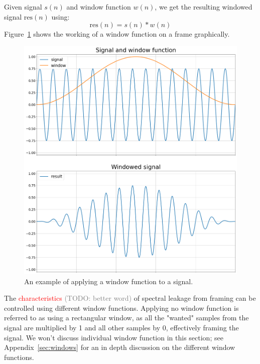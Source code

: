 \documentclass[10pt,twocolumn]{article}
\begin{document}
Given signal $s(n)$ and window function $w(n)$, we get the resulting windowed signal $\text{res}(n)$ using:
\[ \text{res}(n) = s(n) * w(n) \]
Figure~\ref{fig:windowfunc} shows the working of a window function on a frame graphically.
\begin{figure}[h]
    \centering
    \includegraphics[width=\linewidth]{fig/window.png}
    \caption{An example of applying a window function to a signal.}
    \label{fig:windowfunc}
\end{figure}

The \textcolor{red}{characteristics} \textcolor{gray}{(TODO: better word)} of spectral leakage from framing can be controlled using different window functions.
Applying no window function is referred to as using a rectangular window, as all the "wanted" samples from the signal are multiplied by 1 and all other samples by 0, effectively framing the signal. We won't discuss individual window function in this section; see Appendix~\ref{sec:windows} for an in depth discussion on the different window functions.
\end{document}
